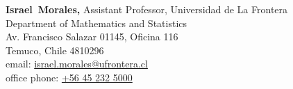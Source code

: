 \documentclass[margin,line]{res}
\begin{document}
\begin{resume}
\parbox{\textwidth}{%
{\bf Israel~Morales,} Assistant Professor, Universidad de La Frontera \\
Department of Mathematics and Statistics \\
Av. Francisco Salazar 01145, Oficina 116 \\
Temuco, Chile 4810296 \\
email: \href{mailto:israel.morales@ufrontera.cl}{israel.morales@ufrontera.cl} \\
office phone: \href{tel:+56452325000}{+56 45 232 5000}}
\par


\end{resume}
\end{document}
